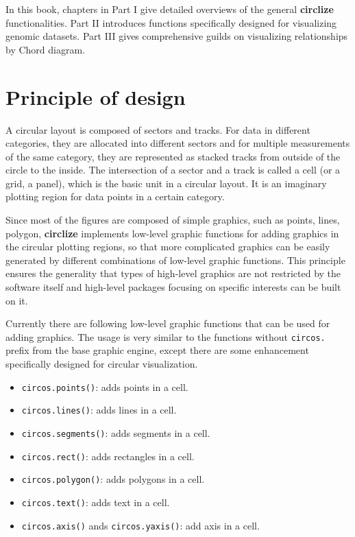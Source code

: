 \documentclass[]{book}
\providecommand{\tightlist}{%
  \setlength{\itemsep}{0pt}\setlength{\parskip}{0pt}}
\begin{document}
In this book, chapters in Part I give detailed overviews of the general
\textbf{circlize} functionalities. Part II introduces functions
specifically designed for visualizing genomic datasets. Part III gives
comprehensive guilds on visualizing relationships by Chord diagram.

\section{Principle of design}\label{principle-of-design}

A circular layout is composed of sectors and tracks. For data in
different categories, they are allocated into different sectors and for
multiple measurements of the same category, they are represented as
stacked tracks from outside of the circle to the inside. The
intersection of a sector and a track is called a cell (or a grid, a
panel), which is the basic unit in a circular layout. It is an imaginary
plotting region for data points in a certain category.

Since most of the figures are composed of simple graphics, such as
points, lines, polygon, \textbf{circlize} implements low-level graphic
functions for adding graphics in the circular plotting regions, so that
more complicated graphics can be easily generated by different
combinations of low-level graphic functions. This principle ensures the
generality that types of high-level graphics are not restricted by the
software itself and high-level packages focusing on specific interests
can be built on it.

Currently there are following low-level graphic functions that can be
used for adding graphics. The usage is very similar to the functions
without \texttt{circos.} prefix from the base graphic engine, except
there are some enhancement specifically designed for circular
visualization.

\begin{itemize}
\tightlist
\item
  \texttt{circos.points()}: adds points in a cell.
\item
  \texttt{circos.lines()}: adds lines in a cell.
\item
  \texttt{circos.segments()}: adds segments in a cell.
\item
  \texttt{circos.rect()}: adds rectangles in a cell.
\item
  \texttt{circos.polygon()}: adds polygons in a cell.
\item
  \texttt{circos.text()}: adds text in a cell.
\item
  \texttt{circos.axis()} ands \texttt{circos.yaxis()}: add axis in a
  cell.
\end{itemize}
\end{document}
